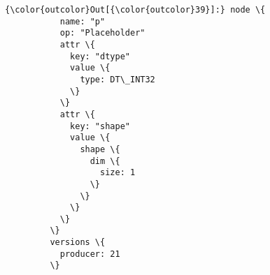 \documentclass[11pt]{article}
\begin{document}
\begin{Verbatim}[commandchars=\\\{\}]
{\color{outcolor}Out[{\color{outcolor}39}]:} node \{
           name: "p"
           op: "Placeholder"
           attr \{
             key: "dtype"
             value \{
               type: DT\_INT32
             \}
           \}
           attr \{
             key: "shape"
             value \{
               shape \{
                 dim \{
                   size: 1
                 \}
               \}
             \}
           \}
         \}
         versions \{
           producer: 21
         \}
\end{Verbatim}
            

    
    
    
    
\end{document}

